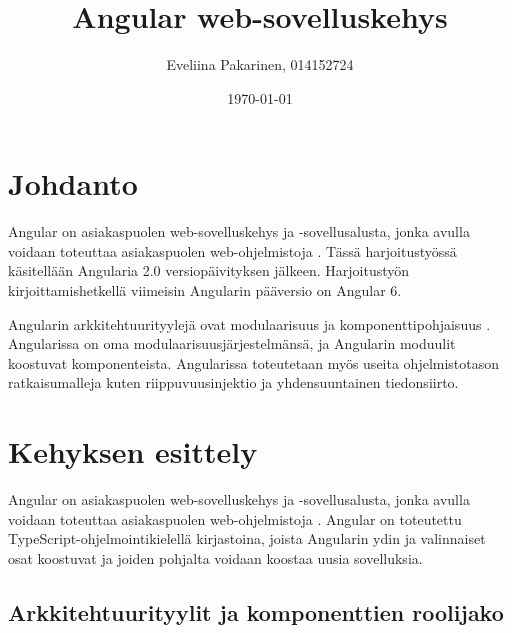 \documentclass[finnish]{tktltiki2}
\title{Angular web-sovelluskehys}
\author{Eveliina Pakarinen, 014152724}
\date{\today}
\theoremstyle{definition}
\theoremstyle{remark}
\numberwithin{figure}{section}
\begin{document}

\frontmatter      %

\maketitle        %

\tableofcontents  %


\mainmatter       %

\setlength{\parindent}{2.5em}
\setlength{\parskip}{0em}
\renewcommand{\baselinestretch}{1.5}
\large

\section{Johdanto}

Angular on asiakaspuolen web-sovelluskehys ja -sovellusalusta, jonka avulla voidaan toteuttaa asiakaspuolen web-ohjelmistoja \cite{ArchitectureOverview}. Tässä harjoitustyössä käsitellään Angularia 2.0 versiopäivityksen jälkeen. Harjoitustyön kirjoittamishetkellä viimeisin Angularin pääversio on Angular 6.

Angularin arkkitehtuurityylejä ovat modulaarisuus ja komponenttipohjaisuus \cite{ArchitectureModules,ArchitectureComponents}. Angularissa on oma modulaarisuusjärjestelmänsä, ja Angularin moduulit koostuvat komponenteista. Angularissa toteutetaan myös useita ohjelmistotason ratkaisumalleja kuten riippuvuusinjektio ja yhdensuuntainen tiedonsiirto.



\section{Kehyksen esittely}

Angular on asiakaspuolen web-sovelluskehys ja -sovellusalusta, jonka avulla voidaan toteuttaa asiakaspuolen web-ohjelmistoja \cite{ArchitectureOverview}. Angular on toteutettu TypeScript-ohjelmointikielellä kirjastoina, joista Angularin ydin ja valinnaiset osat koostuvat ja joiden pohjalta voidaan koostaa uusia sovelluksia.    

\subsection{Arkkitehtuurityylit ja komponenttien roolijako}
\end{document}
